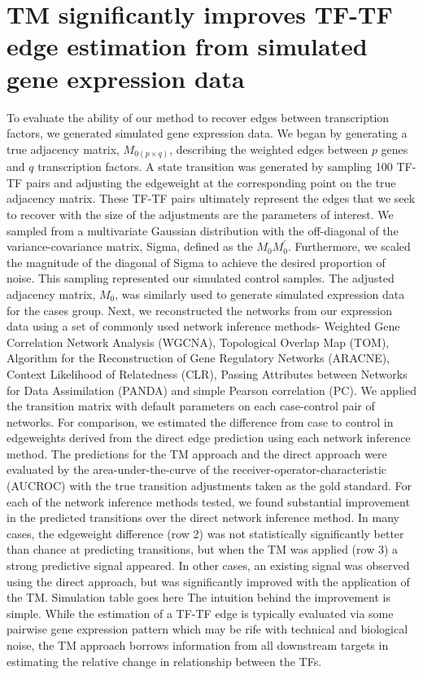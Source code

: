 \documentclass[english]{article}
\begin{document}
\section*{TM significantly improves TF-TF edge estimation from simulated gene
expression data }

To evaluate the ability of our method to recover edges between transcription
factors, we generated simulated gene expression data. We began by
generating a true adjacency matrix, $M_{0\left(p\times q\right)}$,
describing the weighted edges between $p$ genes and $q$ transcription
factors. A state transition was generated by sampling 100 TF-TF pairs
and adjusting the edgeweight at the corresponding point on the true
adjacency matrix. These TF-TF pairs ultimately represent the edges
that we seek to recover with the size of the adjustments are the parameters
of interest. We sampled from a multivariate Gaussian distribution
with the off-diagonal of the variance-covariance matrix, Sigma, defined
as the $M_{0}M_{0}^{\prime}$. Furthermore, we scaled the magnitude
of the diagonal of Sigma to achieve the desired proportion of noise.
This sampling represented our simulated control samples. The adjusted
adjacency matrix, $M_{0}$, was similarly used to generate simulated
expression data for the cases group. Next, we reconstructed the networks
from our expression data using a set of commonly used network inference
methods- Weighted Gene Correlation Network Analysis (WGCNA), Topological
Overlap Map (TOM), Algorithm for the Reconstruction of Gene Regulatory
Networks (ARACNE), Context Likelihood of Relatedness (CLR), Passing
Attributes between Networks for Data Assimilation (PANDA) and simple
Pearson correlation (PC). We applied the transition matrix with default
parameters on each case-control pair of networks. For comparison,
we estimated the difference from case to control in edgeweights derived
from the direct edge prediction using each network inference method.
The predictions for the TM approach and the direct approach were evaluated
by the area-under-the-curve of the receiver-operator-characteristic
(AUCROC) with the true transition adjustments taken as the gold standard.
For each of the network inference methods tested, we found substantial
improvement in the predicted transitions over the direct network inference
method. In many cases, the edgeweight difference (row 2) was not statistically
significantly better than chance at predicting transitions, but when
the TM was applied (row 3) a strong predictive signal appeared. In
other cases, an existing signal was observed using the direct approach,
but was significantly improved with the application of the TM. Simulation
table goes here The intuition behind the improvement is simple. While
the estimation of a TF-TF edge is typically evaluated via some pairwise
gene expression pattern which may be rife with technical and biological
noise, the TM approach borrows information from all downstream targets
in estimating the relative change in relationship between the TFs. 
\end{document}
